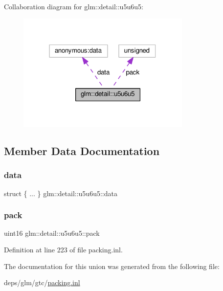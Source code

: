 Collaboration diagram for glm\+:\+:detail\+:\+:u5u6u5\+:
\nopagebreak
\begin{figure}[H]
\begin{center}
\leavevmode
\includegraphics[width=243pt]{d4/dde/unionglm_1_1detail_1_1u5u6u5__coll__graph}
\end{center}
\end{figure}


\subsection{Member Data Documentation}
\mbox{\label{unionglm_1_1detail_1_1u5u6u5_a957492a30539dd0a076ea36d63cd10f9}} 
\subsubsection{\texorpdfstring{data}{data}}
{\footnotesize\ttfamily struct \{ ... \}   glm\+::detail\+::u5u6u5\+::data}

\mbox{\label{unionglm_1_1detail_1_1u5u6u5_a5ea89c1a491b7e1442cad93d92628b2e}} 
\subsubsection{\texorpdfstring{pack}{pack}}
{\footnotesize\ttfamily uint16 glm\+::detail\+::u5u6u5\+::pack}



Definition at line 223 of file packing.\+inl.



The documentation for this union was generated from the following file\+:\begin{DoxyCompactItemize}
\item 
deps/glm/gtc/\hyperlink{packing_8inl}{packing.\+inl}\end{DoxyCompactItemize}
